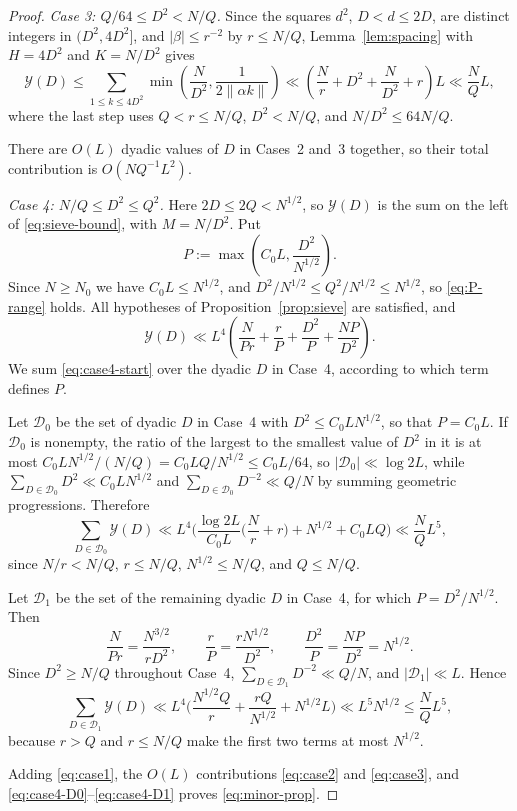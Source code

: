 \documentclass[11pt]{amsart}
\numberwithin{equation}{section}
\numberwithin{figure}{section}
\theoremstyle{definition}
\begin{document}
\begin{proof}
\medskip\noindent\emph{Case 3: $Q/64\le D^2<N/Q$.}
Since the squares $d^2$, $D<d\le2D$, are distinct integers in
$(D^2,4D^2]$, and $|\beta|\le r^{-2}$ by $r\le N/Q$,
Lemma~\ref{lem:spacing} with $H=4D^2$ and $K=N/D^2$ gives
\begin{equation}\label{eq:case3}
  \mathcal Y(D)\le\sum_{1\le k\le4D^2}\min\left(\frac N{D^2},\frac1{2\|\alpha k\|}\right)
  \ll\left(\frac Nr+D^2+\frac N{D^2}+r\right)L\ll\frac NQL,
\end{equation}
where the last step uses $Q<r\le N/Q$, $D^2<N/Q$, and
$N/D^2\le64N/Q$.

There are $O(L)$ dyadic values of $D$ in Cases~2 and~3 together, so their
total contribution is $O(NQ^{-1}L^2)$.

\medskip\noindent\emph{Case 4: $N/Q\le D^2\le Q^2$.}
Here $2D\le2Q<N^{1/2}$, so $\mathcal Y(D)$ is the sum on the left of
\eqref{eq:sieve-bound}, with $M=N/D^2$.  Put
\[
  P:=\max\left(C_0L,\frac{D^2}{N^{1/2}}\right).
\]
Since $N\ge N_0$ we have $C_0L\le N^{1/2}$, and
$D^2/N^{1/2}\le Q^2/N^{1/2}\le N^{1/2}$, so \eqref{eq:P-range} holds.
All hypotheses of Proposition~\ref{prop:sieve} are satisfied, and
\begin{equation}\label{eq:case4-start}
  \mathcal Y(D)\ll L^4\left(\frac N{Pr}+\frac rP+\frac{D^2}P+\frac{NP}{D^2}\right).
\end{equation}
We sum \eqref{eq:case4-start} over the dyadic $D$ in Case~4, according
to which term defines $P$.

Let $\mathcal D_0$ be the set of dyadic $D$ in Case~4 with
$D^2\le C_0LN^{1/2}$, so that $P=C_0L$.  If $\mathcal D_0$ is nonempty,
the ratio of the largest to the smallest value of $D^2$ in it is at most
$C_0LN^{1/2}/(N/Q)=C_0LQ/N^{1/2}\le C_0L/64$, so
$|\mathcal D_0|\ll\log 2L$, while
$\sum_{D\in\mathcal D_0}D^2\ll C_0LN^{1/2}$ and
$\sum_{D\in\mathcal D_0}D^{-2}\ll Q/N$ by summing geometric progressions.
Therefore
\begin{equation}\label{eq:case4-D0}
  \sum_{D\in\mathcal D_0}\mathcal Y(D)
  \ll L^4\bigg(\frac{\log 2L}{C_0L}\Big(\frac Nr+r\Big)+N^{1/2}+C_0LQ\bigg)
  \ll\frac NQL^5,
\end{equation}
since $N/r<N/Q$, $r\le N/Q$, $N^{1/2}\le N/Q$, and $Q\le N/Q$.

Let $\mathcal D_1$ be the set of the remaining dyadic $D$ in Case~4, for
which $P=D^2/N^{1/2}$.  Then
\[
  \frac N{Pr}=\frac{N^{3/2}}{rD^2},\qquad
  \frac rP=\frac{rN^{1/2}}{D^2},\qquad
  \frac{D^2}P=\frac{NP}{D^2}=N^{1/2}.
\]
Since $D^2\ge N/Q$ throughout Case~4, $\sum_{D\in\mathcal D_1}D^{-2}\ll Q/N$,
and $|\mathcal D_1|\ll L$.  Hence
\begin{equation}\label{eq:case4-D1}
  \sum_{D\in\mathcal D_1}\mathcal Y(D)
  \ll L^4\Big(\frac{N^{1/2}Q}r+\frac{rQ}{N^{1/2}}+N^{1/2}L\Big)
  \ll L^5N^{1/2}\le\frac NQL^5,
\end{equation}
because $r>Q$ and $r\le N/Q$ make the first two terms at most $N^{1/2}$.

Adding \eqref{eq:case1}, the $O(L)$ contributions \eqref{eq:case2} and
\eqref{eq:case3}, and \eqref{eq:case4-D0}--\eqref{eq:case4-D1} proves
\eqref{eq:minor-prop}.
\end{proof}
\end{document}
